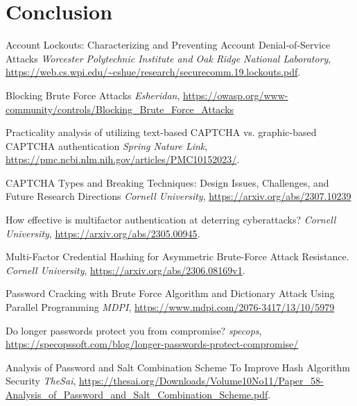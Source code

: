 \documentclass{comjnl}
\begin{document}
\section{Conclusion}

\begin{thebibliography}{99}

   Account Lockouts: Characterizing and Preventing Account Denial-of-Service Attacks
  \textit{Worcester Polytechnic Institute and Oak Ridge National Laboratory}, \url{https://web.cs.wpi.edu/~cshue/research/securecomm.19.lockouts.pdf}.

   Blocking Brute Force Attacks
  \textit{Esheridan}, \url{https://owasp.org/www-community/controls/Blocking_Brute_Force_Attacks}


   Practicality analysis of utilizing text-based CAPTCHA vs. graphic-based CAPTCHA authentication
  \textit{Spring Nature Link}, \url{https://pmc.ncbi.nlm.nih.gov/articles/PMC10152023/}.

   CAPTCHA Types and Breaking Techniques: Design Issues, Challenges, and Future Research Directions
  \textit{Cornell University}, \url{https://arxiv.org/abs/2307.10239}
  

   How effective is multifactor authentication at deterring cyberattacks? 
  \textit{Cornell University}, \url{https://arxiv.org/abs/2305.00945}.
  
   Multi-Factor Credential Hashing for Asymmetric Brute-Force Attack Resistance.
  \textit{Cornell University}, \url{https://arxiv.org/abs/2306.08169v1}.

   Password Cracking with Brute Force Algorithm and Dictionary Attack Using Parallel Programming
  \textit{MDPI}, \url {https://www.mdpi.com/2076-3417/13/10/5979}

   Do longer passwords protect you from compromise?
  \textit{specops}, \url {https://specopssoft.com/blog/longer-passwords-protect-compromise/}

   Analysis of Password and Salt Combination Scheme To Improve Hash Algorithm Security
  \textit{TheSai}, \url{https://thesai.org/Downloads/Volume10No11/Paper_58-Analysis_of_Password_and_Salt_Combination_Scheme.pdf}.


\end{thebibliography}
\end{document}
